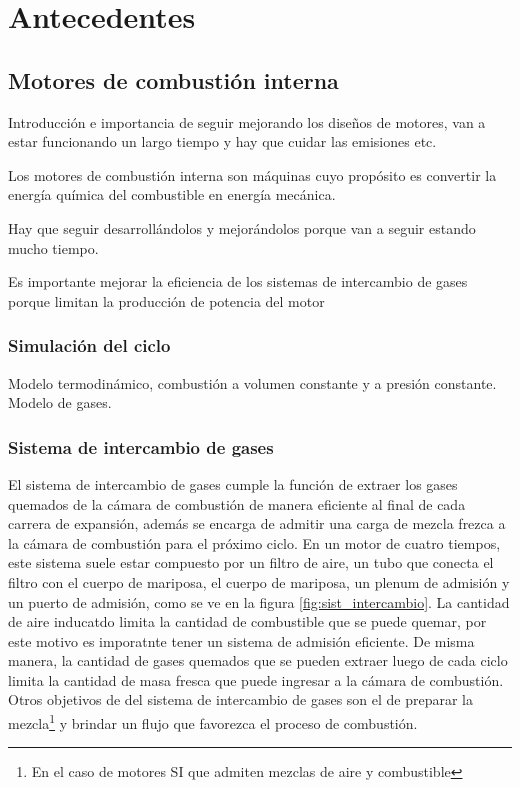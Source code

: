 \chapter{Antecedentes} \label{cap:antecedentes}

\section{Motores de combustión interna}


Introducción e importancia de seguir mejorando los diseños de motores, van a
estar funcionando un largo tiempo y hay que cuidar las emisiones etc.

Los motores de combustión interna son máquinas cuyo propósito es convertir la
energía química del combustible en energía mecánica.

Hay que seguir desarrollándolos y mejorándolos porque van a seguir estando
mucho tiempo.

Es importante mejorar la eficiencia de los sistemas de intercambio de gases
porque limitan la producción de potencia del motor

\subsection{Simulación del ciclo}
%

Modelo termodinámico, combustión a volumen constante y a presión constante.
%
Modelo de gases.



\subsection{Sistema de intercambio de gases}
%
El sistema de intercambio de gases cumple la función de extraer los gases
quemados de la cámara de combustión de manera eficiente al final de cada
carrera de expansión, además se encarga de admitir una carga de mezcla frezca a
la cámara de combustión para el próximo ciclo.
%
En un motor de cuatro tiempos, este sistema suele estar compuesto por un filtro
de aire, un tubo que conecta el filtro con el cuerpo de mariposa, el cuerpo de
mariposa, un plenum de admisión y un puerto de admisión, como se ve en la
figura \ref{fig:sist_intercambio}. 
%
La cantidad de aire inducatdo limita la cantidad de combustible que se puede
quemar, por este motivo es imporatnte tener un sistema de admisión eficiente.
%
De misma manera, la cantidad de gases quemados que se pueden extraer luego de
cada ciclo limita la cantidad de masa fresca que puede ingresar a la cámara de
combustión.
%
Otros objetivos de del sistema de intercambio de gases son el de preparar la
mezcla\footnote{En el caso de motores SI que admiten mezclas de aire y
combustible} y brindar un flujo que favorezca el proceso de combustión.

